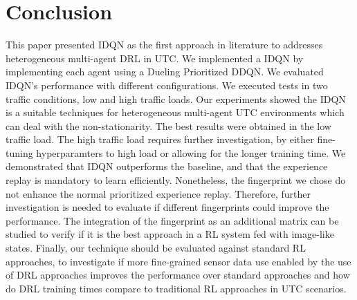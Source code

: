 \documentclass{llncs}
\begin{document}

\section{Conclusion}

This paper presented IDQN as the first approach in literature to addresses heterogeneous multi-agent DRL in UTC. We implemented a IDQN by implementing each agent using a Dueling Prioritized DDQN. We evaluated IDQN's performance with different configurations. We executed tests in two traffic conditions, low and high traffic loads. Our experiments showed the IDQN is a suitable techniques for heterogeneous multi-agent UTC environments which can deal with the non-stationarity. The best results were obtained in the low traffic load. The high traffic load requires further investigation, by either fine-tuning hyperparamters to high load or allowing for the longer training time. We demonstrated that IDQN outperforms the baseline, and that the experience replay is mandatory to learn efficiently. Nonetheless, the fingerprint we chose do not enhance the normal prioritized experience replay. Therefore, further investigation is needed to evaluate if different fingerprints could improve the performance. The integration of the fingerprint as an additional matrix can be studied to verify if it is the best approach in a RL system fed with image-like states. Finally, our technique should be evaluated against standard RL approaches, to investigate if more fine-grained sensor data use enabled by the use of DRL approaches improves the performance over standard approaches and how do DRL training times compare to traditional RL approaches in UTC scenarios. 



 
\end{document}
